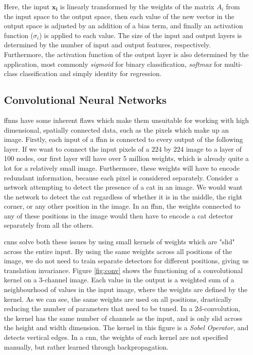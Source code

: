 \documentclass[UKenglish]{uiomasterthesis} %
\theoremstyle{definition}
\begin{document}
Here, the input $\bm{x_i}$ is linearly transformed by the weights of the matrix $A_i$ from the input space to the output space, then each value of the new vector in the output space is adjusted by an addition of a bias term, and finally an activation function ($\sigma_i$) is applied to each value. The size of the input and output layers is determined by the number of input and output features, respectively. Furthermore, the activation function of the output layer is also determined by the application, most commonly {\it sigmoid} for binary classification, {\it softmax} for multi-class classification and simply identity for regression.


\subsection{Convolutional Neural Networks}

\acp{ffnn} have some inherent flaws which make them unsuitable for working with high dimensional, spatially connected data, such as the pixels which make up an image. Firstly, each input of a \ac{ffnn} is connected to every output of the following layer. If we want to connect the input pixels of a $224$ by $224$ image to a layer of 100 nodes, our first layer will have over 5 million weights, which is already quite a lot for a relatively small image. Furthermore, these weights will have to encode redundant information, because each pixel is considered separately. Consider a network attempting to detect the presence of a cat in an image. We would want the network to detect the cat regardless of whether it is in the middle, the right corner, or any other position in the image. In an \ac{ffnn}, the weights connected to any of these positions in the image would then have to encode a cat detector separately from all the others.

\acp{cnn} solve both these issues by using small kernels of weights which are "slid" across the entire input. By using the same weights across all positions of the image, we do not need to train separate detectors for different positions, giving us translation invariance. Figure \ref{fig:conv} shows the functioning of a convolutional kernel on a 3-channel image. Each value in the output is a weighted sum of a neighbourhood of values in the input image, where the weights are defined by the kernel. As we can see, the same weights are used on all positions, drastically reducing the number of parameters that need to be tuned. In a 2d-convolution, the kernel has the same number of channels as the input, and is only slid across the height and width dimension. The kernel in this figure is a {\it Sobel Operator}, and detects vertical edges. In a \ac{cnn}, the weights of each kernel are not specified manually, but rather learned through backpropagation.
\end{document}
